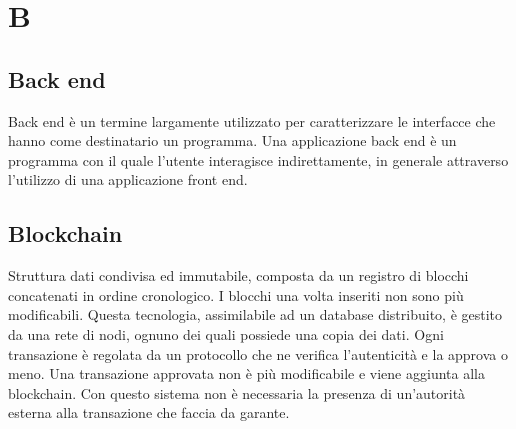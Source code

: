 \section*{B}
\subsection*{Back end}
Back end è un termine largamente utilizzato per caratterizzare le interfacce che hanno come destinatario un programma. Una applicazione back end è un programma con il quale l’utente interagisce indirettamente, in generale attraverso l’utilizzo di una applicazione front end.

\subsection*{Blockchain}
Struttura dati condivisa ed immutabile, composta da un registro di blocchi concatenati in ordine cronologico. I blocchi una volta inseriti non sono più modificabili. Questa tecnologia, assimilabile ad un database distribuito, è gestito da una rete di nodi, ognuno dei quali possiede una copia dei dati.  Ogni transazione è regolata da un protocollo che ne verifica l'autenticità e la approva o meno. Una transazione approvata non è più modificabile e viene aggiunta alla blockchain. Con questo sistema non è necessaria la presenza di un'autorità esterna alla transazione che faccia da garante.

